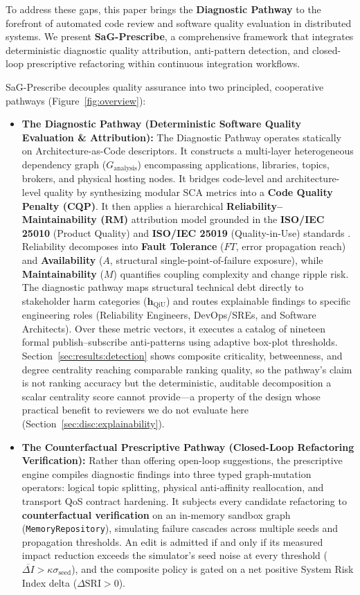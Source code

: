 To address these gaps, this paper brings the \textbf{Diagnostic Pathway} to the forefront of automated code review and software quality evaluation in distributed systems. We present \textbf{SaG-Prescribe}, a comprehensive framework that integrates deterministic diagnostic quality attribution, anti-pattern detection, and closed-loop prescriptive refactoring within continuous integration workflows.

SaG-Prescribe decouples quality assurance into two principled, cooperative pathways (Figure~\ref{fig:overview}):
\begin{itemize}
    \item \textbf{The Diagnostic Pathway (Deterministic Software Quality Evaluation \& Attribution):} The Diagnostic Pathway operates statically on Architecture-as-Code descriptors. It constructs a multi-layer heterogeneous dependency graph ($G_{\text{analysis}}$) encompassing applications, libraries, topics, brokers, and physical hosting nodes. It bridges code-level and architecture-level quality by synthesizing modular SCA metrics into a \textbf{Code Quality Penalty (CQP)}. It then applies a hierarchical \textbf{Reliability--Maintainability (RM)} attribution model grounded in the \textbf{ISO/IEC 25010} (Product Quality) and \textbf{ISO/IEC 25019} (Quality-in-Use) standards \citep{iso25010_2023, iso25019_2023}. Reliability decomposes into \textbf{Fault Tolerance} ($FT$, error propagation reach) and \textbf{Availability} ($A$, structural single-point-of-failure exposure), while \textbf{Maintainability} ($M$) quantifies coupling complexity and change ripple risk. The diagnostic pathway maps structural technical debt directly to stakeholder harm categories ($\mathbf{h}_{\text{QiU}}$) and routes explainable findings to specific engineering roles (Reliability Engineers, DevOps/SREs, and Software Architects). Over these metric vectors, it executes a catalog of nineteen formal publish--subscribe anti-patterns using adaptive box-plot thresholds. Section~\ref{sec:results:detection} shows composite criticality, betweenness, and degree centrality reaching comparable ranking quality, so the pathway's claim is not ranking accuracy but the deterministic, auditable decomposition a scalar centrality score cannot provide---a property of the design whose practical benefit to reviewers we do not evaluate here (Section~\ref{sec:disc:explainability}).
    \item \textbf{The Counterfactual Prescriptive Pathway (Closed-Loop Refactoring Verification):} Rather than offering open-loop suggestions, the prescriptive engine compiles diagnostic findings into three typed graph-mutation operators: logical topic splitting, physical anti-affinity reallocation, and transport QoS contract hardening. It subjects every candidate refactoring to \textbf{counterfactual verification} on an in-memory sandbox graph (\texttt{MemoryRepository}), simulating failure cascades across multiple seeds and propagation thresholds. An edit is admitted if and only if its measured impact reduction exceeds the simulator's seed noise at every threshold ($\overline{\Delta I} > \kappa \sigma_{\text{seed}}$), and the composite policy is gated on a net positive System Risk Index delta ($\Delta\text{SRI} > 0$).
\end{itemize}

